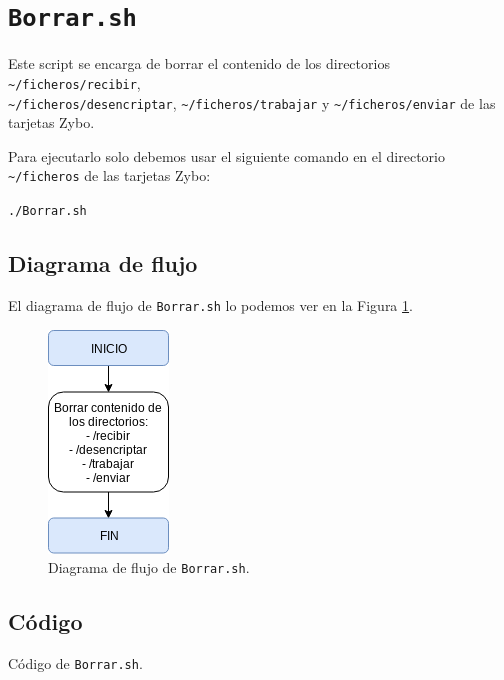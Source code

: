 \section{\texttt{Borrar.sh}}
\hypertarget{ScriptBorrar}{}
Este script se encarga de borrar el contenido de los directorios \texttt{\textasciitilde/ficheros/recibir},\\ \texttt{\textasciitilde/ficheros/desencriptar}, \texttt{\textasciitilde/ficheros/trabajar} y \texttt{\textasciitilde/ficheros/enviar} de las tarjetas Zybo.

Para ejecutarlo solo debemos usar el siguiente comando en el directorio \texttt{\textasciitilde/ficheros} de las tarjetas Zybo:
\begin{center}
	\texttt{./Borrar.sh}
\end{center}

\subsection{Diagrama de flujo}
El diagrama de flujo de \texttt{Borrar.sh} lo podemos ver en la Figura \ref{Diagrama de flujo de Borrar.sh}.
\begin{figure}[h]
	\centering
	\includegraphics[scale=0.9]{Anexos/Anexo3/Diagramas/Borrar.png}
	\caption{Diagrama de flujo de \texttt{Borrar.sh}.}
	\label{Diagrama de flujo de Borrar.sh}
\end{figure}

\subsection{Código}

\begin{center}
	Código de \texttt{Borrar.sh}.
\end{center}